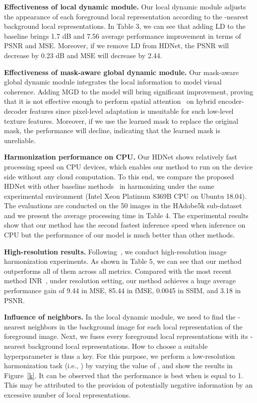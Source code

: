 \documentclass[sigconf]{acmart}
\begin{document}
\noindent
\textbf{Effectiveness of local dynamic module.} Our local dynamic module adjusts the appearance of each foreground local representation according to the -nearest background local representations. In Table 3, we can see that adding LD to the baseline brings 1.7 dB and 7.56 average performance improvement in terms of PSNR and MSE. Moreover, if we remove LD from HDNet, the PSNR will decrease by 0.23 dB and MSE will decrease by 2.44.


\noindent
\textbf{Effectiveness of mask-aware global dynamic module.} Our mask-aware global dynamic module integrates the local information to model visual coherence. Adding MGD to the model will bring significant improvement, proving that it is not effective enough to perform spatial attention~\cite{RAIN,hang2022scs} on hybrid encoder-decoder features since pixel-level adaptation is unsuitable for such low-level texture features. Moreover, if we use the learned mask to replace the original mask, the performance will decline, indicating that the learned mask is unreliable.


\noindent
\textbf{Harmonization performance on CPU.} Our HDNet shows relatively fast processing speed on CPU devices, which enables our method to run on the device side without any cloud computation. To this end, we compare the proposed HDNet with other baseline methods~\cite{SSAM,DoveNet,Bargainnet,IHT,liang2021spatial} in harmonizing under the same experimental environment (Intel Xeon Platinum 8369B CPU on Ubuntu 18.04). The evaluations are conducted on the 50 images in the HAdobe5k sub-dataset and we present the average processing time in Table 4. The experimental results show that our method has the second fastest inference speed when inference on CPU but the performance of our model is much better than other methods.

\noindent
\textbf{High-resolution results.}
Following~\cite{CDTNet}, we conduct high-resolution image harmonization experiments. As shown in Table 5, we can see that our method outperforms all of them across all metrics. Compared with the most recent method INR~\cite{inr}, under  resolution setting, our method achieves a huge average performance gain of 9.44 in MSE, 85.44 in fMSE, 0.0045 in SSIM, and 3.18 in PSNR. 


\noindent
\textbf{Influence of neighbors.} In the local dynamic module, we need to find the -nearest neighbors in the background image for each local representation of the foreground image. Next, we fuses every foreground local representations with its -nearest background local representations. How to choose a suitable hyperparameter  is thus a key. For this purpose, we perform a low-resolution harmonization task (i.e., ) by varying the value of , and show the results in Figure~\ref{k}. It can be observed that the performance is best when  is equal to 1. This may be attributed to the provision of potentially negative information by an excessive number of local representations.
\end{document}
